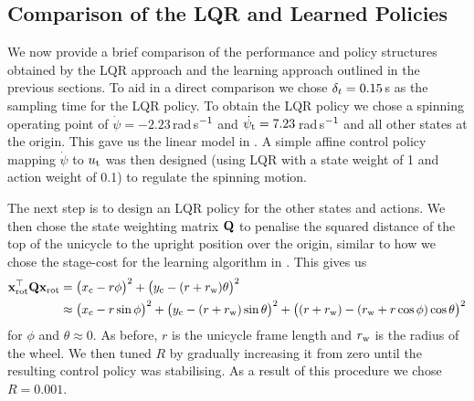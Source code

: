 \subsection{Comparison of the LQR and Learned Policies}
We now provide a brief comparison of the performance and policy structures obtained by the LQR approach and the learning approach outlined in the previous sections. To aid in a direct comparison we chose $\delta_t = 0.15\,$s as the sampling time for the LQR policy. To obtain the LQR policy we chose a spinning operating point of $\dot\psi = -2.23\,$rad$\,$s$^{-1}$ and $\dot\psi_{\text{t}} = 7.23\,$rad$\,$s$^{-1}$ and all other states at the origin. This gave us the linear model in . A simple affine control policy mapping $\dot\psi$ to $u_{\text{t}}$ was then designed (using LQR with a state weight of 1 and action weight of 0.1) to regulate the spinning motion.

The next step is to design an LQR policy for the other states and actions. We then chose the state weighting matrix $\mathbf{Q}$ to penalise the squared distance of the top of the unicycle to the upright position over the origin, similar to how we chose the stage-cost for the learning algorithm in . This gives us
\begin{align*}
\mathbf{x}_{\text{rot}}^\top\mathbf{Q}\mathbf{x}_{\text{rot}} &= \big(x_{\text{c}} - r\phi\big)^2 + \big(y_{\text{c}} - (r+r_{\text{w}})\theta\big)^2 \\
&\approx \big(x_{\text{c}} - r\sin\phi\big)^2 + \big(y_{\text{c}} - (r+r_{\text{w}})\sin\theta\big)^2
+ \big( (r+r_{\text{w}}) - (r_{\text{w}} + r\cos\phi)\cos\theta \big)^2
\end{align*}
for $\phi$ and $\theta \approx 0$. As before, $r$ is the unicycle frame length and $r_{\text{w}}$ is the radius of the wheel. We then tuned $R$ by gradually increasing it from zero until the resulting control policy was stabilising. As a result of this procedure we chose $R = 0.001$.



